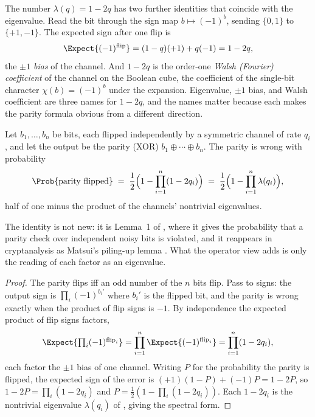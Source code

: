 The number $\lambda(q) = 1 - 2q$ has two further identities that coincide with
the eigenvalue. Read the bit through the sign map $b \mapsto (-1)^{b}$, sending
$\{0, 1\}$ to $\{+1, -1\}$. The expected sign after one flip is
\[
  \Expect{(-1)^{\text{flip}}}
  = (1 - q)(+1) + q(-1)
  = 1 - 2q,
\]
the \emph{$\pm 1$ bias} of the channel. And $1 - 2q$ is the order-one
\emph{Walsh (Fourier) coefficient} of the channel on the Boolean cube, the
coefficient of the single-bit character $\chi(b) = (-1)^{b}$ under the
expansion. Eigenvalue, $\pm 1$ bias, and Walsh coefficient are three names for
$1 - 2q$, and the names matter because each makes the parity formula obvious
from a different direction.

\begin{proposition}
\label{prop:parity-spectral}
Let $b_1, \ldots, b_n$ be bits, each flipped independently by a symmetric
channel of rate $q_i$, and let the output be the parity (XOR) $b_1 \oplus \cdots
\oplus b_n$. The parity is wrong with probability
\[
  \Prob{\text{parity flipped}}
  \;=\; \frac{1}{2}\Big(1 - \prod_{i=1}^{n}(1 - 2 q_i)\Big)
  \;=\; \frac{1}{2}\Big(1 - \prod_{i=1}^{n} \lambda(q_i)\Big),
\]
half of one minus the product of the channels' nontrivial eigenvalues.
\end{proposition}

The identity is not new: it is Lemma~1 of \textcite{gallager-1962}, where
it gives the probability that a parity check over independent noisy bits
is violated, and it reappears in cryptanalysis as Matsui's piling-up lemma
\parencite{matsui-1993}.
What the operator view adds is only the reading of each factor as an
eigenvalue.

\begin{proof}
The parity flips iff an odd number of the $n$ bits flip. Pass to signs: the
output sign is $\prod_i (-1)^{b_i'}$ where $b_i'$ is the flipped bit, and the
parity is wrong exactly when the product of flip signs is $-1$. By independence
the expected product of flip signs factors,
\[
  \Expect{\textstyle\prod_i (-1)^{\text{flip}_i}}
  = \prod_{i=1}^{n} \Expect{(-1)^{\text{flip}_i}}
  = \prod_{i=1}^{n}(1 - 2 q_i),
\]
each factor the $\pm 1$ bias of one channel. Writing $P$ for the probability the
parity is flipped, the expected sign of the error is $(+1)(1 - P) + (-1)P = 1 -
2P$, so $1 - 2P = \prod_i (1 - 2q_i)$ and $P = \tfrac{1}{2}(1 - \prod_i (1 -
2q_i))$. Each $1 - 2q_i$ is the nontrivial eigenvalue $\lambda(q_i)$ of
, giving the spectral form.
\end{proof}

